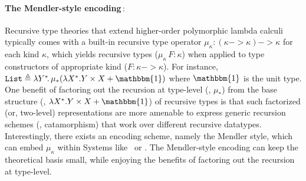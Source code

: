\paragraph{The Mendler-style encoding\,$:$}
Recursive type theories that extend higher-order polymorphic lambda calculi
typically comes with a built-in recursive type operator
$\mu_\kappa : (\kappa -> \kappa) -> \kappa$ for each kind $\kappa$,
which yields recursive types ($\mu_\kappa\,F : \kappa$) when applied to
type constructors of appropriate kind ($F : \kappa -> \kappa$).
For instance,
$\texttt{List} \triangleq \l Y^{*}\!.\,\mu_{*}(\l X^{*}.Y\times X+ \mathbbm{1})$
where $\mathbbm{1}$ is the unit type. One benefit of factoring out
the recursion at type-level (\eg, $\mu_{*}$) from
the base structure (\eg, $\l X^{*}.Y\times X+ \mathbbm{1}$) of
recursive types is that such factorized (or, two-level) representations
are more amenable to express generic recursion schemes (\eg, catamorphism)
that work over different recursive datatypes.
Interestingly, there exists an encoding scheme, namely the Mendler style,
which can embed $\mu_{\kappa}$ within Systems like \Fw\ or \Fi.
The Mendler-style encoding can keep the theoretical basis small,
while enjoying the benefits of factoring out the recursion at type-level.


